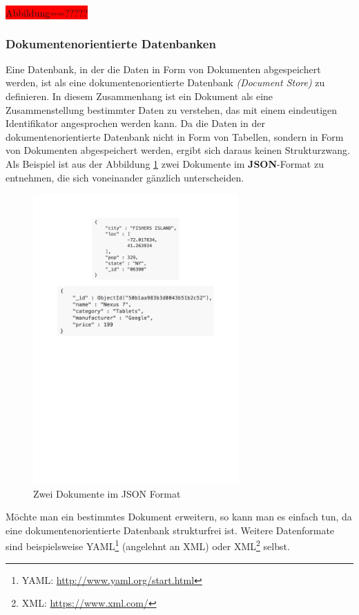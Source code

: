 \colorbox{red}{Abbildung==?????}

\subsubsection{Dokumentenorientierte Datenbanken}

Eine Datenbank, in der die Daten in Form von Dokumenten abgespeichert werden, ist als eine dokumentenorientierte Datenbank \textit{(Document Store)} zu definieren. In diesem Zusammenhang ist ein Dokument als eine Zusammenstellung bestimmter Daten zu verstehen, das mit einem eindeutigen Identifikator angesprochen werden kann. Da die Daten in der dokumentenorientierte Datenbank nicht in Form von Tabellen, sondern in Form von Dokumenten abgespeichert werden, ergibt sich daraus keinen Strukturzwang. Als Beispiel ist aus der Abbildung \ref{img:dodb} zwei Dokumente im \textbf{JSON}-Format zu entnehmen, die sich voneinander gänzlich unterscheiden.
\begin{figure}[H]
\centering
\includegraphics[trim = 0mm 150mm 0mm 20mm, clip, width=0.7\textwidth]{resources/dodb}
\caption[Zwei Dokumente im JSON Format]{Zwei Dokumente im JSON Format}
\label{img:dodb}
\end{figure}
Möchte man ein bestimmtes Dokument erweitern, so kann man es einfach tun, da eine dokumentenorientierte Datenbank strukturfrei ist. Weitere Datenformate sind beispielsweise YAML\footnote{YAML: \url{http://www.yaml.org/start.html}} (angelehnt an XML) oder XML\footnote{XML: \url{https://www.xml.com/}} selbst.

